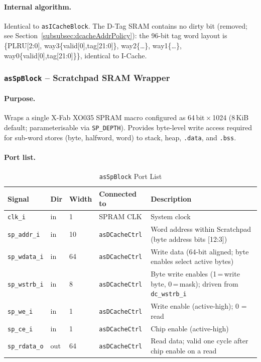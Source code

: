 \paragraph{Internal algorithm.}
Identical to \texttt{asICacheBlock}.
The D-Tag SRAM contains no dirty bit (removed; see
Section~\ref{subsubsec:dcacheAddrPolicy}): the 96-bit tag word layout
is \{PLRU[2:0], way3\{valid[0],tag[21:0]\}, way2\{\ldots\},
way1\{\ldots\}, way0\{valid[0],tag[21:0]\}\}, identical to I-Cache.

\subsubsection{\texttt{asSpBlock} -- Scratchpad SRAM Wrapper}
\label{subsubsec:asSpBlock}

\paragraph{Purpose.}
Wraps a single X-Fab XO035 SPRAM macro configured as
64\,bit\,$\times$\,1024 (8\,KiB default; parameterisable via
\texttt{SP\_DEPTH}).
Provides byte-level write access required for sub-word stores (byte,
halfword, word) to stack, heap, \texttt{.data}, and \texttt{.bss}.

\paragraph{Port list.}

\begin{table}[H]
\caption{\texttt{asSpBlock} Port List}
\label{tab:asSpBlockPorts}
\centering
\begin{tabularx}{\textwidth}{|l |l |l |l |X|}
  \hline
  Signal & Dir & Width & Connected to & Description \\
  \hline
  \hline
  \texttt{clk\_i}        & in  & 1  & SPRAM CLK             & System clock \\
  \hline
  \texttt{sp\_addr\_i}   & in  & 10 & \texttt{asDCacheCtrl} & Word address within Scratchpad (byte address bits [12:3]) \\
  \hline
  \texttt{sp\_wdata\_i}  & in  & 64 & \texttt{asDCacheCtrl} & Write data (64-bit aligned; byte enables select active bytes) \\
  \hline
  \texttt{sp\_wstrb\_i}  & in  & 8  & \texttt{asDCacheCtrl} & Byte write enables (1\,=\,write byte, 0\,=\,mask); driven from \texttt{dc\_wstrb\_i} \\
  \hline
  \texttt{sp\_we\_i}     & in  & 1  & \texttt{asDCacheCtrl} & Write enable (active-high); 0 = read \\
  \hline
  \texttt{sp\_ce\_i}     & in  & 1  & \texttt{asDCacheCtrl} & Chip enable (active-high) \\
  \hline
  \texttt{sp\_rdata\_o}  & out & 64 & \texttt{asDCacheCtrl} & Read data; valid one cycle after chip enable on a read \\
  \hline
\end{tabularx}
\end{table}


